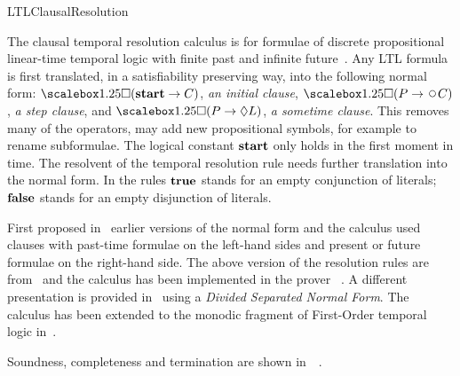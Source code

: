 \begin{entry}{LTLClausalResolution}
\begin{clarifications}
  The clausal temporal resolution calculus is for formulae of discrete propositional
  linear-time temporal logic with finite past and infinite
  future~\cite{Prior@OUP1967,Kamp@PhD1968}.
  Any LTL formula is first translated, in a satisfiability preserving way, into the
  following  normal form: 
  $\Always(\lstart \rightarrow C)$, \emph{an initial clause},
  $\Always(P \rightarrow \Next C)$, \emph{a step clause}, and
  $\Always(P \rightarrow \sometime L)$, \emph{a sometime clause}.
  This removes many of the operators, may add new propositional 
  symbols, for example to rename subformulae.
  The logical constant ${\bf start}$ only holds in the first moment in time. 
  The resolvent of the temporal resolution rule needs further translation into
  the normal form. 
  In the rules ${\bf true}$ stands for an empty conjunction of literals; ${\bf false}$
  stands for an empty disjunction of literals.
\end{clarifications}

\begin{history}
  First proposed in~\cite{Fis90-resolve} earlier versions of 
  the normal form and the calculus used clauses with past-time formulae
  on the left-hand sides and present or future formulae on the
  right-hand side. The above version of the resolution rules are
  from~\cite{FDP01} and the calculus has been implemented in the prover
  \TRPpp~\cite{HustadtKonev2003a}. 
  A different presentation is provided in~\cite{DFK02}
  using a {\em Divided Separated Normal Form}.
  The calculus has been extended to the monodic fragment of First-Order 
  temporal logic in~.
\end{history}

\begin{technicalities}
  Soundness, completeness and termination are shown in~~\cite{FDP01}.
\end{technicalities}


\end{entry}
